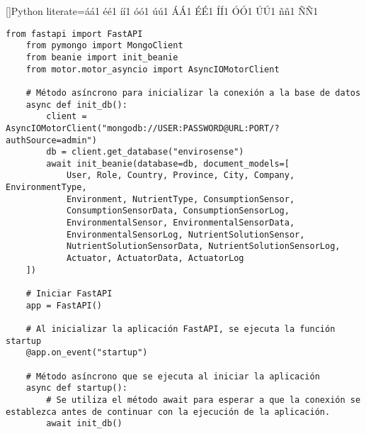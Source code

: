 []{Python}{
literate={á}{{\'a}}1 {é}{{\'e}}1 {í}{{\'i}}1 {ó}{{\'o}}1 {ú}{{\'u}}1
{Á}{{\'A}}1 {É}{{\'E}}1 {Í}{{\'I}}1 {Ó}{{\'O}}1 {Ú}{{\'U}}1
{ñ}{{\~n}}1 {Ñ}{{\~N}}1
}


\begin{lstlisting}[label=cod:bd_connection,caption=Cliente MQTT, language=PythonUTF8]
    from fastapi import FastAPI
    from pymongo import MongoClient
    from beanie import init_beanie
    from motor.motor_asyncio import AsyncIOMotorClient

    # Método asíncrono para inicializar la conexión a la base de datos
    async def init_db():
        client = AsyncIOMotorClient("mongodb://USER:PASSWORD@URL:PORT/?authSource=admin")
        db = client.get_database("envirosense")
        await init_beanie(database=db, document_models=[
            User, Role, Country, Province, City, Company, EnvironmentType, 
            Environment, NutrientType, ConsumptionSensor, 
            ConsumptionSensorData, ConsumptionSensorLog, 
            EnvironmentalSensor, EnvironmentalSensorData, 
            EnvironmentalSensorLog, NutrientSolutionSensor, 
            NutrientSolutionSensorData, NutrientSolutionSensorLog, 
            Actuator, ActuatorData, ActuatorLog
    ])

    # Iniciar FastAPI
    app = FastAPI()

    # Al inicializar la aplicación FastAPI, se ejecuta la función startup
    @app.on_event("startup")

    # Método asíncrono que se ejecuta al iniciar la aplicación
    async def startup():
        # Se utiliza el método await para esperar a que la conexión se establezca antes de continuar con la ejecución de la aplicación.
        await init_db()
\end{lstlisting}

